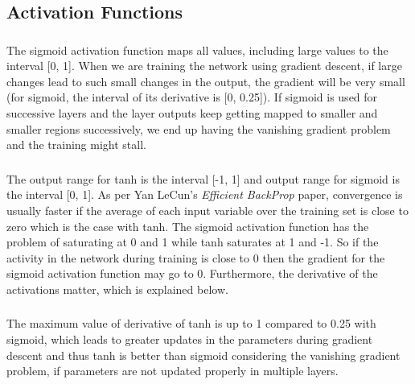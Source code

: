 \documentclass[a4paper]{article}
\begin{document}
\clearpage

\subsection{Activation Functions}
\subsubsection{}
The sigmoid activation function maps all values, including large values to the interval [0, 1]. When we are training the network using gradient descent, if large changes lead to such small changes in the output, the gradient will be very small (for sigmoid, the interval of its derivative is [0, 0.25]). If sigmoid is used for successive layers and the layer outputs keep getting mapped to smaller and smaller regions successively, we end up having the vanishing gradient problem and the training might stall.

\subsubsection{}
The output range for tanh is the interval [-1, 1] and output range for sigmoid is the interval [0, 1]. As per Yan LeCun's \textit{Efficient BackProp} paper, convergence is usually faster if the average of each input variable over the training set is close to zero which is the case with tanh. The sigmoid activation function has the problem of saturating at 0 and 1 while tanh saturates at 1 and -1. So if the activity in the network during training is close to 0 then the gradient for the sigmoid activation function may go to 0. Furthermore, the derivative of the activations matter, which is explained below.

\subsubsection{}
The maximum value of derivative of tanh is up to 1 compared to 0.25 with sigmoid, which leads to greater updates in the parameters during gradient descent and thus tanh is better than sigmoid considering the vanishing gradient problem, if parameters are not updated properly in multiple layers.
\end{document}
